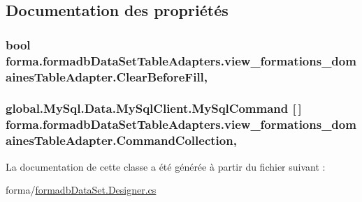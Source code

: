 \subsection{Documentation des propriétés}
\subsubsection[{\texorpdfstring{Clear\+Before\+Fill}{ClearBeforeFill}}]{\setlength{\rightskip}{0pt plus 5cm}bool forma.\+formadb\+Data\+Set\+Table\+Adapters.\+view\+\_\+formations\+\_\+domaines\+Table\+Adapter.\+Clear\+Before\+Fill\hspace{0.3cm}{\ttfamily [get]}, {\ttfamily [set]}}\hypertarget{classforma_1_1formadb_data_set_table_adapters_1_1view__formations__domaines_table_adapter_a529e84b05869ebdcb3bbb59b342eaad7}{}\label{classforma_1_1formadb_data_set_table_adapters_1_1view__formations__domaines_table_adapter_a529e84b05869ebdcb3bbb59b342eaad7}
\subsubsection[{\texorpdfstring{Command\+Collection}{CommandCollection}}]{\setlength{\rightskip}{0pt plus 5cm}global.\+My\+Sql.\+Data.\+My\+Sql\+Client.\+My\+Sql\+Command \mbox{[}$\,$\mbox{]} forma.\+formadb\+Data\+Set\+Table\+Adapters.\+view\+\_\+formations\+\_\+domaines\+Table\+Adapter.\+Command\+Collection\hspace{0.3cm}{\ttfamily [get]}, {\ttfamily [protected]}}\hypertarget{classforma_1_1formadb_data_set_table_adapters_1_1view__formations__domaines_table_adapter_aa0bdd76e67f0b37942c6e5407c8e861f}{}\label{classforma_1_1formadb_data_set_table_adapters_1_1view__formations__domaines_table_adapter_aa0bdd76e67f0b37942c6e5407c8e861f}


La documentation de cette classe a été générée à partir du fichier suivant \+:\begin{DoxyCompactItemize}
\item 
forma/\hyperlink{formadb_data_set_8_designer_8cs}{formadb\+Data\+Set.\+Designer.\+cs}\end{DoxyCompactItemize}
